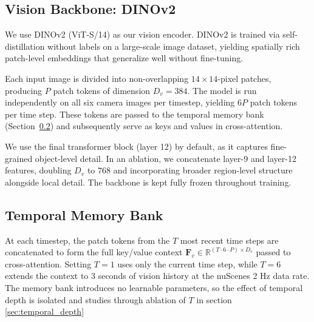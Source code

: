 \documentclass[10pt,twocolumn,letterpaper]{article}
\begin{document}

\subsection{Vision Backbone: DINOv2}
We use DINOv2 (ViT-S/14) \cite{oquab2024dinov2learningrobustvisual} as our vision encoder. DINOv2 is trained via self-distillation without labels on a large-scale image dataset, yielding spatially rich patch-level embeddings that generalize well without fine-tuning. 

Each input image is divided into non-overlapping $14\times14$-pixel patches, producing $P$ patch tokens of dimension $D_v=384$. The model is run independently on all six camera images per timestep, yielding $6P$ patch tokens per time step. These tokens are passed to the temporal memory bank (Section~\ref{sec:membank}) and subsequently serve as keys and values in cross-attention. 

We use the final transformer block (layer 12) by default, as it captures fine-grained object-level detail. In an ablation, we concatenate layer-9 and layer-12 features, doubling $D_v$ to $768$ and incorporating broader region-level structure alongside local detail. The backbone is kept fully frozen throughout training.

\subsection{Temporal Memory Bank}
\label{sec:membank}
At each timestep, the patch tokens from the $T$ most recent time steps are concatenated to form the full key/value context $\mathbf{F}_v \in \mathbb{R}^{(T \cdot 6 \cdot P) \times D_v}$ passed to cross-attention. Setting $T=1$ uses only the current time step, while $T=6$ extends the context to 3 seconds of vision history at the nuScenes 2 Hz data rate. The memory bank introduces no learnable parameters, so the effect of temporal depth is isolated and studies through ablation of $T$ in section \ref{sec:temporal_depth}
\end{document}
